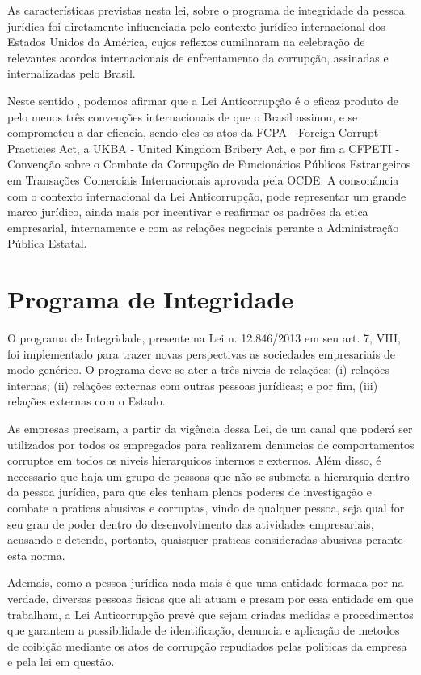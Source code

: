As características previstas nesta lei, sobre o programa de integridade da pessoa jurídica foi diretamente influenciada pelo contexto jurídico internacional dos Estados Unidos da América, cujos reflexos cumilnaram na celebração de relevantes acordos internacionais de enfrentamento da corrupção, assinadas e internalizadas pelo Brasil. 

Neste sentido , podemos afirmar que a Lei Anticorrupção é o eficaz produto de pelo menos três convenções internacionais de que o Brasil assinou, e se comprometeu a dar eficacia, sendo eles os atos da FCPA - Foreign Corrupt Practicies Act, a UKBA - United Kingdom Bribery Act, e por fim a CFPETI - Convenção sobre o Combate da Corrupção de Funcionários Públicos Estrangeiros em Transações Comerciais Internacionais aprovada pela OCDE. A consonância com o contexto internacional da Lei Anticorrupção, pode representar um grande marco jurídico, ainda mais por incentivar e reafirmar os padrões da etica empresarial, internamente e com as relações negociais perante a Administração Pública Estatal. 

\section{Programa de Integridade}

O programa de Integridade, presente na Lei n. 12.846/2013 em seu art. 7, VIII, foi implementado para trazer novas perspectivas as sociedades empresariais de modo genérico.  O programa deve se ater a três niveis de relações: (i) relações internas; (ii) relações externas com outras pessoas jurídicas; e por fim, (iii) relações externas com o Estado.

As empresas precisam, a partir da vigência dessa Lei, de um canal que poderá ser utilizados por todos os empregados para realizarem denuncias de comportamentos corruptos em todos os niveis hierarquicos internos e externos. Além disso, é necessario que haja um grupo de pessoas que não se submeta a hierarquia dentro da pessoa jurídica, para que eles tenham plenos poderes de investigação e combate a praticas abusivas e corruptas, vindo de qualquer pessoa, seja qual for seu grau de poder dentro do desenvolvimento das atividades empresariais, acusando e detendo, portanto, quaisquer praticas consideradas abusivas perante esta norma. 

Ademais, como a pessoa jurídica nada mais é que uma entidade formada por na verdade, diversas pessoas fisicas que ali atuam e presam por essa entidade em que trabalham, a Lei Anticorrupção prevê que sejam criadas medidas e procedimentos que garantem a possibilidade de identificação, denuncia e aplicação de metodos de coibição mediante os atos de corrupção repudiados pelas politicas da empresa e pela lei em questão. 

